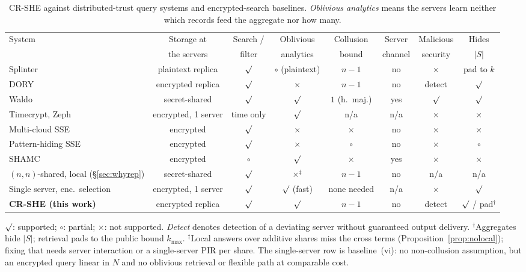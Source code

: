 \documentclass[a4paper,fleqn]{cas-sc}
\providecommand{\checkmark}{\ensuremath{\surd}}
\begin{document}
\begin{table}[pos=t,width=\textwidth]
\caption{CR-SHE against distributed-trust query systems and encrypted-search
baselines. \emph{Oblivious analytics} means the servers learn neither which
records feed the aggregate nor how many.}
\label{tab:compare}
\centering
\scriptsize
\setlength{\tabcolsep}{3pt}
\begin{tabular*}{\tblwidth}{@{\extracolsep{\fill}}lccccccc@{}}
\toprule
System & Storage at & Search / & Oblivious & Collusion & Server & Malicious &
Hides \\
 & the servers & filter & analytics & bound & channel & security & $|S|$ \\
\midrule
Splinter \citep{splinter} & plaintext replica & $\checkmark$ &
$\circ$ (plaintext) & $n-1$ & no & $\times$ & pad to $k$ \\
DORY \citep{dory} & encrypted replica & $\checkmark$ & $\times$ & $n-1$ & no &
detect & $\checkmark$ \\
Waldo \citep{waldo} & secret-shared & $\checkmark$ & $\checkmark$ &
$1$ (h.\ maj.) & yes & $\checkmark$ & $\checkmark$ \\
Timecrypt, Zeph \citep{timecrypt,zeph} & encrypted, 1 server & time only &
$\checkmark$ & n/a & n/a & $\times$ & $\times$ \\
Multi-cloud SSE \citep{xu2021privacy} & encrypted & $\checkmark$ & $\times$ &
$\times$ & no & $\times$ & $\times$ \\
Pattern-hiding SSE \citep{xu2023symmetric} & encrypted & $\checkmark$ &
$\times$ & $\circ$ & no & $\times$ & $\circ$ \\
SHAMC \citep{wang2020shamc} & encrypted & $\circ$ & $\checkmark$ & $\times$ &
yes & $\times$ & $\times$ \\
\midrule
$(n,n)$-shared, local (\S\ref{sec:whyrep}) & secret-shared & $\checkmark$ &
$\times^{\ddagger}$ & $n-1$ & no & n/a & n/a \\
Single server, enc.\ selection & encrypted, 1 server & $\checkmark$ &
$\checkmark$ (fast) & none needed & n/a & $\times$ & $\checkmark$ \\
\textbf{CR-SHE (this work)} & encrypted replica & $\checkmark$ & $\checkmark$ &
$n-1$ & no & detect & $\checkmark$ / pad$^{\dagger}$ \\
\bottomrule
\end{tabular*}
\vspace{3pt}
\begin{flushleft}
\footnotesize
$\checkmark$: supported; $\circ$: partial; $\times$: not supported.
\emph{Detect} denotes detection of a deviating server without guaranteed
output delivery. $^{\dagger}$Aggregates hide $|S|$; retrieval pads to the
public bound $k_{\max}$. $^{\ddagger}$Local answers over additive shares miss
the cross terms (Proposition~\ref{prop:nolocal}); fixing that needs server
interaction or a single-server PIR per share. The single-server row is
baseline~(vi): no non-collusion assumption, but an encrypted query linear in
$N$ and no oblivious retrieval or flexible path at comparable cost.
\end{flushleft}
\end{table}
\end{document}
